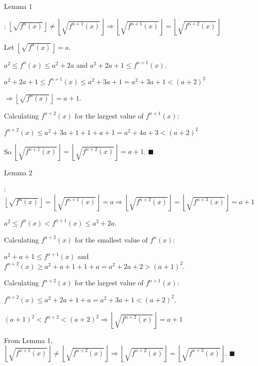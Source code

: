 \begin{solution}
	\begin{bolded}Lemma 1\end{bolded}:
$\boxed{\left \lfloor \sqrt {f^{n}(x)} \right \rfloor \neq \left \lfloor \sqrt {f^{n+1}(x)} \right \rfloor \Longrightarrow \left \lfloor \sqrt {f^{n+1}(x)} \right \rfloor = \left \lfloor \sqrt {f^{n+2}(x)} \right \rfloor}$

Let $\left \lfloor \sqrt {f^{n}(x)} \right \rfloor  = a$. 

$a^2 \leq f^n(x) \leq a^2 + 2a$ and $a^2+2a+1\leq f^{n+1}(x)$.

$a^2+2a+1\leq f^{n+1}(x) \leq a^2 + 3a+1 = a^2 + 3a + 1 < (a+2)^2$

$\Longrightarrow \left \lfloor \sqrt {f^{n}(x)} \right \rfloor = a + 1$.

Calculating $f^{n+2}(x)$ for the largest value of $f^{n+1}(x)$:

$f^{n+2}(x)\leq a^2 + 3a+ 1 + 1 + a + 1 = a^2 + 4a+ 3 < (a+2)^2$

So $\left \lfloor \sqrt {f^{n+1}(x)} \right \rfloor = \left \lfloor \sqrt {f^{n+2}(x)} \right \rfloor = a+1$. $\blacksquare$


\begin{bolded}Lemma 2\end{bolded}:
$\boxed{\left \lfloor \sqrt {f^{n}(x)} \right \rfloor = \left \lfloor \sqrt {f^{n+1}(x)} \right \rfloor = a \Longrightarrow \left \lfloor \sqrt {f^{n+2}(x)} \right \rfloor = \left \lfloor \sqrt {f^{n+3}(x)} \right \rfloor = a+1 }$

$a^2 \leq f^n(x) < f^{n+1}(x) \leq a^2 + 2a$. 

Calculating $f^{n+2}(x)$ for the smallest value of $f^n(x)$:

$a^2+a+1 \leq f^{n+1}(x)$ and $f^{n+2}(x) \geq a^2 + a + 1+ 1+a = a^2 +2a+2 > (a+1)^2$.

Calculating $f^{n+2}(x)$ for the largest value of $f^{n+1}(x)$:

$f^{n+2}(x) \leq a^2 + 2a + 1+ a = a^2 +3a+1 < (a+2)^2$.

$(a+1)^2 < f^{n+2}<(a+2)^2 \Rightarrow \left \lfloor \sqrt {f^{n+2}(x)} \right \rfloor = a+1 $

From Lemma 1, $\left \lfloor \sqrt {f^{n+1}(x)} \right \rfloor \neq \left \lfloor \sqrt {f^{n+2}(x)} \right \rfloor \Longrightarrow  \left \lfloor \sqrt {f^{n+2}(x)} \right \rfloor = \left \lfloor \sqrt {f^{n+3}(x)} \right \rfloor$. $\blacksquare$



\end{solution}
